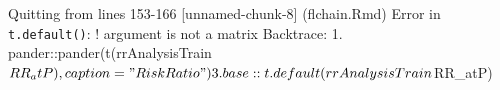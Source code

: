 \documentclass[
]{article}
\newenvironment{Shaded}{\begin{snugshade}}{\end{snugshade}}
\newcommand{\AttributeTok}[1]{\textcolor[rgb]{0.13,0.29,0.53}{#1}}
\newcommand{\FunctionTok}[1]{\textcolor[rgb]{0.13,0.29,0.53}{\textbf{#1}}}
\newcommand{\NormalTok}[1]{#1}
\newcommand{\SpecialCharTok}[1]{\textcolor[rgb]{0.81,0.36,0.00}{\textbf{#1}}}
\newcommand{\StringTok}[1]{\textcolor[rgb]{0.31,0.60,0.02}{#1}}
\begin{document}
\begin{Shaded}
\end{Shaded}

Quitting from lines 153-166 {[}unnamed-chunk-8{]} (flchain.Rmd) Error in
\texttt{t.default()}: ! argument is not a matrix Backtrace: 1.
pander::pander(t(rrAnalysisTrain\(RR_atP), caption = "Risk Ratio")  3. base::t.default(rrAnalysisTrain\)RR\_atP)

\begin{Shaded}
\end{Shaded}
\end{document}
